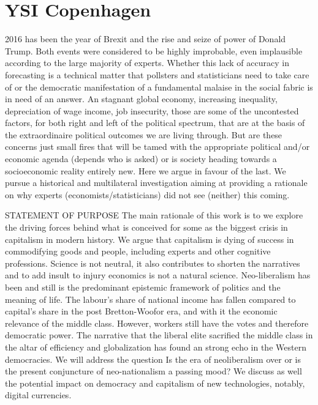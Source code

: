 \documentclass[11pt, onecolumn]{article}
\begin{document}
\section{YSI Copenhagen}
2016 has been the year of Brexit and the rise and seize of power of Donald Trump. Both events were considered to be highly improbable, even implausible  according to the large majority of experts.
Whether this lack of accuracy in forecasting is a technical matter that  pollsters and statisticians need to take care of or the democratic manifestation of a fundamental malaise in the social fabric is in need of an answer.
An stagnant global economy, increasing inequality, depreciation of wage income, job insecurity, those are some of the uncontested factors, for both right and left of the political spectrum, that are at the basis of the extraordinaire political outcomes we are living through.
But are these concerns just small fires that will be tamed with the appropriate political and/or economic agenda (depends who is asked) or is society heading towards a  socioeconomic reality entirely new.
Here we argue in favour of the last. We pursue a historical and multilateral investigation aiming at providing a rationale on why experts (economists/statisticians) did not see (neither) this coming.

STATEMENT OF PURPOSE
The main rationale of this work is to we explore the driving forces behind what is conceived for some as the biggest crisis in capitalism in modern history. We argue that capitalism is dying of success in commodifying goods and people, including experts and other cognitive professions. 
Science is not neutral, it also contributes to shorten the narratives and to add insult to injury economics is not a natural science. Neo-liberalism has been and still is the predominant epistemic framework of politics and the meaning of life. 
The labour's share of national income has fallen compared to capital's share in the post Bretton-Woofor era, and with it the economic relevance of the middle class.  However, workers still have the votes and therefore democratic power. The narrative that the liberal elite sacrified the middle class in the altar of efficiency and globalization has found an strong echo in the Western democracies. 
We will address the question Is the era of neoliberalism over or is the present conjuncture of neo-nationalism a passing mood?
We discuss as well the potential impact on democracy and capitalism of new technologies, notably, digital currencies.
\end{document}
